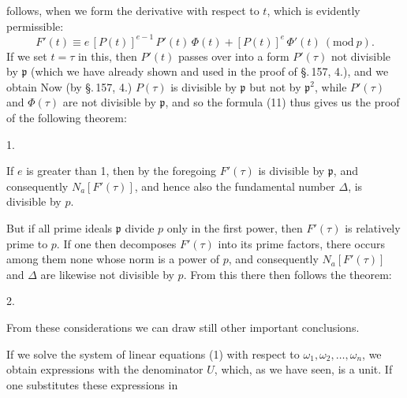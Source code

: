 
follows, when we form the derivative with respect to $t$, which is evidently permissible:
\[
F'(t) \equiv e\,[P(t)]^{e-1}\,P'(t)\,\Phi(t) + [P(t)]^e\,\Phi'(t)\ (\mathrm{mod}\ p).
\]
If we set $t=\tau$ in this, then $P'(t)$ passes over into a form $P'(\tau)$ not divisible by $\mathfrak{p}$ (which we have already shown and used in the proof of \S.\,157, 4.), and we obtain
Now (by \S.\,157, 4.) $P(\tau)$ is divisible by $\mathfrak{p}$ but not by $\mathfrak{p}^2$, while $P'(\tau)$ and $\Phi(\tau)$ are not divisible by $\mathfrak{p}$, and so the formula (11) thus gives us the proof of the following theorem:

1. 

If $e$ is greater than 1, then by the foregoing $F'(\tau)$ is divisible by $\mathfrak{p}$, and consequently $N_a[F'(\tau)]$, and hence also the fundamental number $\Delta$, is divisible by $p$.

But if all prime ideals $\mathfrak{p}$ divide $p$ only in the first power, then $F'(\tau)$ is relatively prime to $p$. If one then decomposes $F'(\tau)$ into its prime factors, there occurs among them none whose norm is a power of $p$, and consequently $N_a[F'(\tau)]$ and $\Delta$ are likewise not divisible by $p$. From this there then follows the theorem:

2. 

From these considerations we can draw still other important conclusions.

If we solve the system of linear equations (1) with respect to $\omega_1, \omega_2, \ldots, \omega_n$, we obtain expressions with the denominator $U$, which, as we have seen, is a unit. If one substitutes these expressions in
